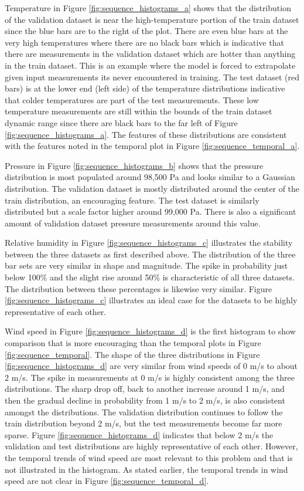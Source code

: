 Temperature in Figure \ref{fig:sequence_histograms_a} shows that the distribution of the validation dataset is near the high-temperature portion of the train dataset since the blue bars are to the right of the plot. There are even blue bars at the very high temperatures where there are no black bars which is indicative that there are measurements in the validation dataset which are hotter than anything in the train dataset. This is an example where the model is forced to extrapolate given input measurements its never encountered in training. The test dataset (red bars) is at the lower end (left side) of the temperature distributions indicative that colder temperatures are part of the test measurements. These low temperature measurements are still within the bounds of the train dataset dynamic range since there are black bars to the far left of Figure \ref{fig:sequence_histograms_a}. The features of these distributions are consistent with the features noted in the temporal plot in Figure \ref{fig:sequence_temporal_a}.

Pressure in Figure \ref{fig:sequence_histograms_b} shows that the pressure distribution is most populated around 98,500 Pa and looks similar to a Gaussian distribution. The validation dataset is mostly distributed around the center of the train distribution, an encouraging feature. The test dataset is similarly distributed but a scale factor higher around 99,000 Pa. There is also a significant amount of validation dataset pressure measurements around this value.

Relative humidity in Figure \ref{fig:sequence_histograms_c} illustrates the stability between the three datasets as first described above. The distribution of the three bar sets are very similar in shape and magnitude. The spike in probability just below 100\% and the slight rise around 50\% is characteristic of all three datasets. The distribution between these percentages is likewise very similar. Figure \ref{fig:sequence_histograms_c} illustrates an ideal case for the datasets to be highly representative of each other.

Wind speed in Figure \ref{fig:sequence_histograms_d} is the first histogram to show comparison that is more encouraging than the temporal plots in Figure \ref{fig:sequence_temporal}. The shape of the three distributions in Figure \ref{fig:sequence_histograms_d} are very similar from wind speeds of 0 m/s to about 2 m/s. The spike in measurements at 0 m/s is highly consistent among the three distributions. The sharp drop off, back to another increase around 1 m/s, and then the gradual decline in probability from 1 m/s to 2 m/s, is also consistent amongst the distributions. The validation distribution continues to follow the train distribution beyond 2 m/s, but the test measurements become far more sparse. Figure \ref{fig:sequence_histograms_d} indicates that below 2 m/s the validation and test distributions are highly representative of each other. However, the temporal trends of wind speed are most relevant to this problem and that is not illustrated in the histogram. As stated earlier, the temporal trends in wind speed  are not clear in Figure \ref{fig:sequence_temporal_d}.


